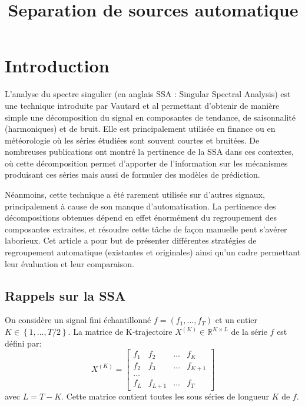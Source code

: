 \documentclass{gretsi}
\title{Separation de sources automatique}
\affil{2}{L2TI - Université Paris 13 \\
         99 Avenue Jean Baptiste Clément, 93430 Villetaneuse}}
\newcommand{\R}{\mathbb R}
\newcommand{\val}[3]{(#1_1 #3 \dots #3 #1_#2)}
\begin{document}
\maketitle


\section{Introduction}
\label{sec:intro}

L'analyse du spectre singulier (en anglais SSA : Singular Spectral Analysis) est une technique introduite par Vautard et al \cite{vautard_89_SSA} permettant d'obtenir de manière simple une décomposition du signal en composantes de tendance, de saisonnalité (harmoniques) et de bruit. Elle est principalement utilisée en finance ou en météorologie où les séries étudiées sont souvent courtes et bruitées. De nombreuses publications ont montré la pertinence de la SSA dans ces contextes, où cette décomposition permet d'apporter de l'information sur les mécanismes produisant ces séries mais aussi de formuler des modèles de prédiction.


Néanmoins, cette technique a été rarement utilisée sur d'autres signaux, principalement à cause de son manque d'automatisation. La pertinence des décompositions obtenues dépend en effet énormément du regroupement des composantes extraites, et résoudre cette tâche de façon manuelle peut s'avérer laborieux. Cet article a pour but de présenter différentes stratégies de regroupement automatique (existantes et originales) ainsi qu'un cadre permettant leur évaluation et leur comparaison.



\subsection{Rappels sur la SSA}
\label{sub:rap}
On considère un signal fini échantillonné $f = \val{f}{T}{,}$ et un entier $K \in \left \{ 1, \dots, T/2 \right \}$. La matrice de K-trajectoire $X^{(K)} \in \R^{K\times L}$ de la série $f$ est défini par:
$$ X^{(K)} = \begin{bmatrix}
	f_1 & f_2 &\dots & f_K\\
	f_2 & f_3 &\dots & f_{K+1}\\
	\dots\\
	f_{L} & f_{L+1} &\dots & f_T
\end{bmatrix}$$ avec $L = T-K$. Cette matrice contient toutes les sous séries de longueur $K$ de $f$.
\end{document}
